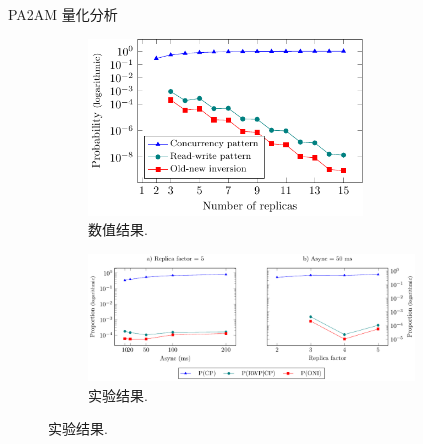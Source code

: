 \begin{frame}{PA2AM 量化分析}
  \begin{figure}
	\begin{subfigure}{0.40\textwidth}
	  \centering
	  \includegraphics[width = 0.80\textwidth]{figures/oni-pgfplot.pdf}
	  \caption{数值结果.}
	\end{subfigure}%
	\begin{subfigure}{0.60\textwidth}
	  \centering
	  \includegraphics[width = 0.95\textwidth]{figures/experiment-oni-pgfplot.pdf}
	  \caption{实验结果.}
	\end{subfigure}
  \end{figure}


\end{frame}
